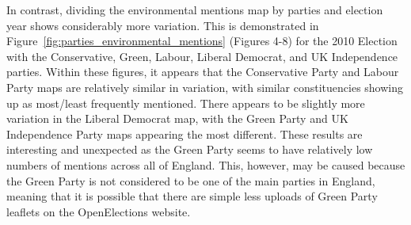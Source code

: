 \documentclass[12pt,letterpaper]{article}
\begin{document}
In contrast, dividing the environmental mentions map by parties and election year shows considerably more variation. This is demonstrated in Figure~\ref{fig:parties_environmental_mentions} (Figures 4-8) for the 2010 Election with the Conservative, Green, Labour, Liberal Democrat, and UK Independence parties. Within these figures, it appears that the Conservative Party and Labour Party maps are relatively similar in variation, with similar constituencies showing up as most/least frequently mentioned. There appears to be slightly more variation in the Liberal Democrat map, with the Green Party and UK Independence Party maps appearing the most different. These results are interesting and unexpected as the Green Party seems to have relatively low numbers of mentions across all of England. This, however, may be caused because the Green Party is not considered to be one of the main parties in England, meaning that it is possible that there are simple less uploads of Green Party leaflets on the OpenElections website.
\end{document}
